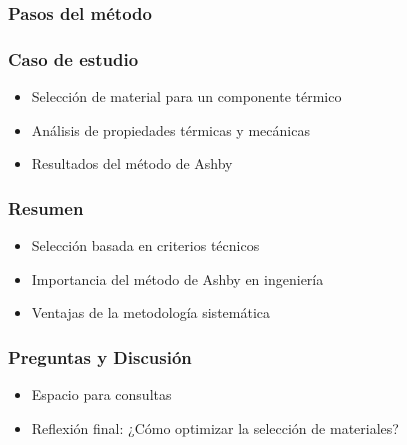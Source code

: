 \documentclass[aspectratio=169]{beamer}
\begin{document}
\begin{frame}{\frametitle{Pasos del método}}
\end{frame}

\begin{frame}{\frametitle{Caso de estudio}}
  \begin{itemize}
    \item Selección de material para un componente térmico
    \item Análisis de propiedades térmicas y mecánicas
    \item Resultados del método de Ashby
  \end{itemize}
\end{frame}

\begin{frame}{\frametitle{Resumen}}
  \begin{itemize}
    \item Selección basada en criterios técnicos
    \item Importancia del método de Ashby en ingeniería
    \item Ventajas de la metodología sistemática
  \end{itemize}
\end{frame}

\begin{frame}{\frametitle{Preguntas y Discusión}}
  \begin{itemize}
    \item Espacio para consultas
    \item Reflexión final: ¿Cómo optimizar la selección de materiales?
  \end{itemize}
\end{frame}
\end{document}
